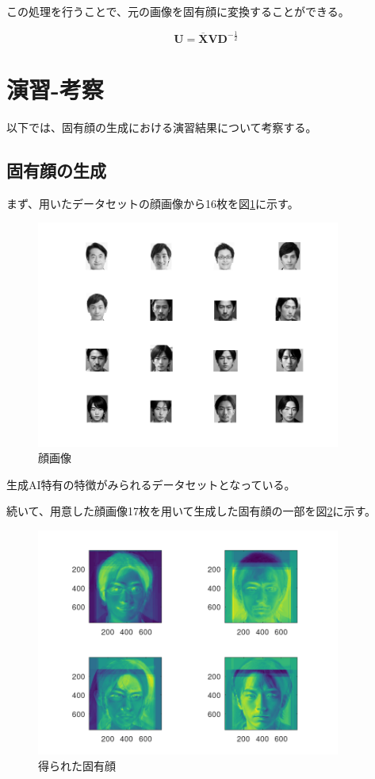 \documentclass[a4paper,11pt,dvipdfmx]{jsarticle}
\begin{document}
この処理を行うことで、元の画像を固有顔に変換することができる。

\begin{equation}
    \mathbf{U} = \overline{\mathbf{X}} \mathbf{V} \mathbf{D}^{-\frac{1}{2}}
\end{equation}

\section{演習-考察}
以下では、固有顔の生成における演習結果について考察する。

\subsection{固有顔の生成}
まず、用いたデータセットの顔画像から16枚を図\ref{faces}に示す。

\begin{figure}[h]
\centering
\includegraphics[width=100mm]{./img/figure.png}
\caption{顔画像}
\label{faces}
\end{figure}

生成AI特有の特徴がみられるデータセットとなっている。
\newpage

続いて、用意した顔画像17枚を用いて生成した固有顔の一部を図\ref{eigenfaces}に示す。

\begin{figure}[h]
\centering
\includegraphics[width=100mm]{./img/figure2.png}
\caption{得られた固有顔}
\label{eigenfaces}
\end{figure}
\end{document}
